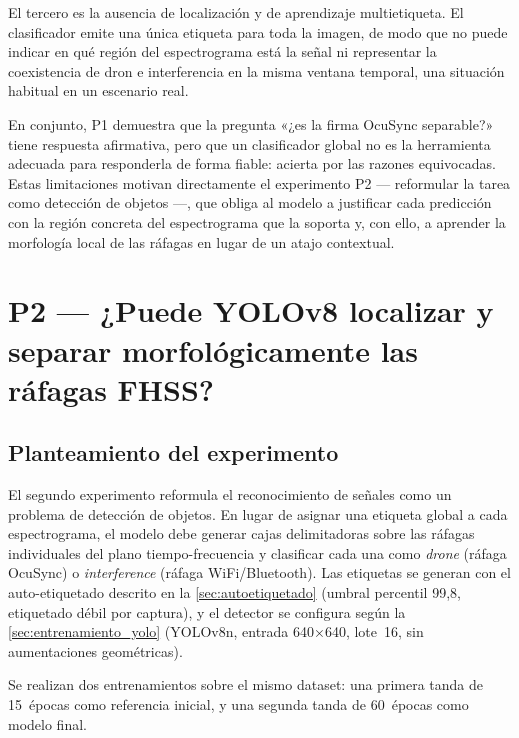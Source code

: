 El tercero es la ausencia de localización y de aprendizaje multietiqueta. El clasificador emite una única etiqueta para toda la imagen, de modo que no puede indicar en qué región del espectrograma está la señal ni representar la coexistencia de dron e interferencia en la misma ventana temporal, una situación habitual en un escenario real.


En conjunto, P1 demuestra que la pregunta «¿es la firma OcuSync separable?» tiene respuesta afirmativa, pero que un clasificador global no es la herramienta adecuada para responderla de forma fiable: acierta por las razones equivocadas. Estas limitaciones motivan directamente el experimento P2 --- reformular la tarea como detección de objetos ---, que obliga al modelo a justificar cada predicción con la región concreta del espectrograma que la soporta y, con ello, a aprender la morfología local de las ráfagas en lugar de un atajo contextual.








\section{P2 --- ¿Puede YOLOv8 localizar y separar morfológicamente las ráfagas FHSS?}
\label{sec:bloque_yolo}

\subsection{Planteamiento del experimento}
\label{sec:p2_planteamiento}

El segundo experimento reformula el reconocimiento de señales como un problema de detección de objetos. En lugar de asignar una etiqueta global a cada espectrograma, el modelo debe generar cajas delimitadoras sobre las ráfagas individuales del plano tiempo-frecuencia y clasificar cada una como \emph{drone} (ráfaga OcuSync) o \emph{interference} (ráfaga WiFi/Bluetooth). Las etiquetas se generan con el auto-etiquetado descrito en la \cref{sec:autoetiquetado} (umbral percentil 99,8, etiquetado débil por captura), y el detector se configura según la \cref{sec:entrenamiento_yolo} (YOLOv8n, entrada 640×640, lote~16, sin aumentaciones geométricas).

Se realizan dos entrenamientos sobre el mismo dataset: una primera tanda de \num{15}~épocas como referencia inicial, y una segunda tanda de \num{60}~épocas como modelo final.

